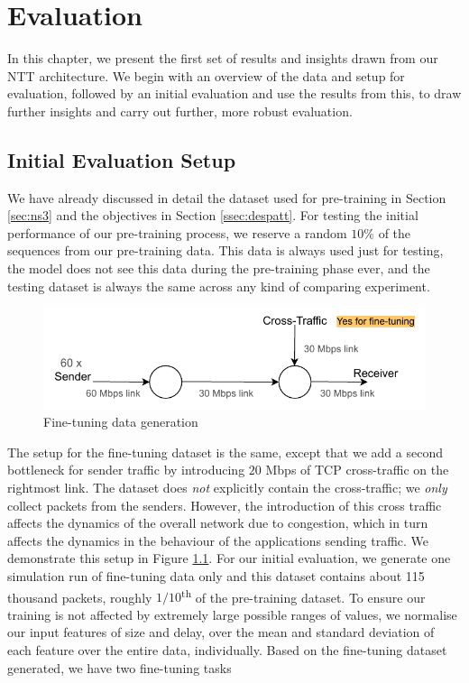 \chapter{Evaluation}
\label{cha:evaluation}

In this chapter, we present the first set of results and insights drawn from our NTT architecture. We begin with an overview of the data and setup for evaluation, followed by an initial evaluation and use the results from this,  to draw further insights and carry out further, more robust evaluation.

\section{Initial Evaluation Setup}
\label{eval:evaldat}

We have already discussed in detail the dataset used for pre-training in Section \ref{sec:ns3} and the objectives in Section \ref{ssec:despatt}. For testing the initial performance of our pre-training process, we reserve a random $10\%$ of the sequences from our pre-training data. This data is always used just for testing, the model does not see this data during the pre-training phase ever, and the testing dataset is always the same across any kind of comparing experiment.

\begin{figure}[h]
  \begin{center}
    \includegraphics[scale=1.2]{figures/simple_topo_ft.pdf}
    \caption{Fine-tuning data generation}
    \label{fig:topo_ft}
  \end{center}
\end{figure}

The setup for the fine-tuning dataset is the same, except that we add a second bottleneck for sender traffic by introducing $20$ Mbps of TCP cross-traffic on the rightmost link. The dataset does \emph{not} explicitly contain the cross-traffic; we \emph{only} collect packets from the senders. However, the introduction of this cross traffic affects the dynamics of the overall network due to  congestion, which in turn affects the dynamics in the behaviour of the applications sending traffic. We demonstrate this setup in Figure \ref{fig:topo_ft}. For our initial evaluation, we generate one simulation run of fine-tuning data only and this dataset contains about 115 thousand packets, \ie roughly $1/10$\textsuperscript{th} of the pre-training dataset. To ensure our training is not affected by extremely large possible ranges of values, we normalise our input features of size and delay, over the mean and standard deviation of each feature over the entire data, individually.\cite{scaling} Based on the fine-tuning dataset generated, we have two fine-tuning tasks 


